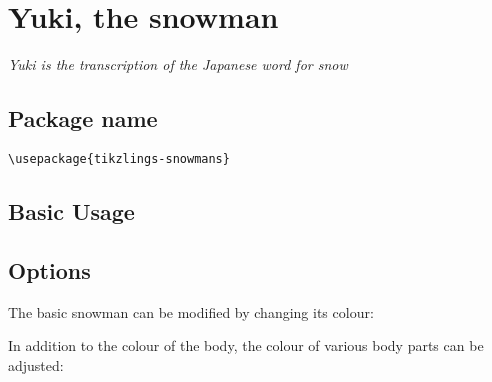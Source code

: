 \documentclass[parskip=half]{scrartcl}
\begin{document}
%
%
\clearpage
\section[Snowman]{Yuki, the snowman}

\emph{Yuki is the transcription of the Japanese word for snow}

\subsection{Package name}

\begin{tcolorbox}[lower separated=false, lefthand width=.8\linewidth]
\vspace*{0.5cm}
\lstinline|\usepackage{tikzlings-snowmans}| 
\vspace*{0.5cm}
\end{tcolorbox}

\subsection{Basic Usage}

\begin{tcblisting}{}
\snowman
\end{tcblisting}

\subsection{Options}

The basic snowman can be modified by changing its colour:
\begin{tcblisting}{}
\snowman[body=blue]
\end{tcblisting}

In addition to the colour of the body, the colour of various body parts can be adjusted:
\begin{tcblisting}{}
\snowman[eye=red]
\end{tcblisting}
\begin{tcblisting}{}
\snowman[nose=red]
\end{tcblisting}
\begin{tcblisting}{}
\snowman[mouth=red]
\end{tcblisting}
\begin{tcblisting}{}
\snowman[buttons=red]
\end{tcblisting}
\end{document}
